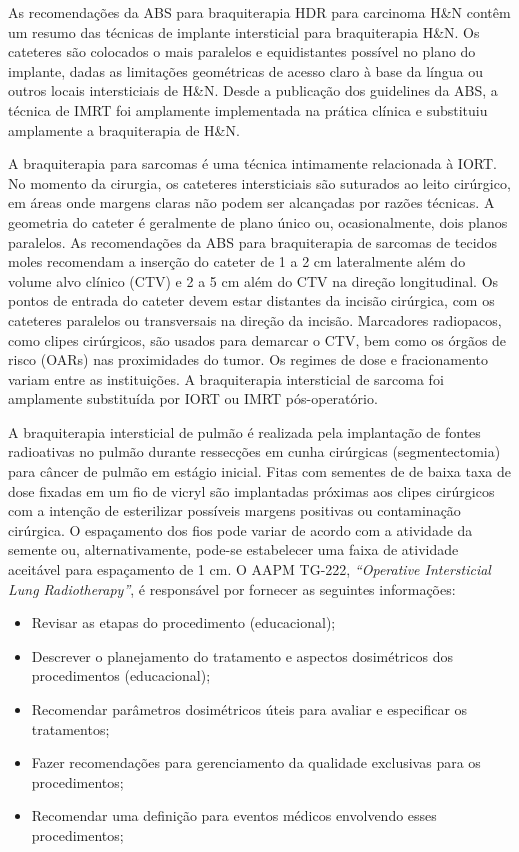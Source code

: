 \documentclass[11pt,a4paper]{article}
\begin{document}
	As recomendações da ABS para braquiterapia HDR para carcinoma H\&N contêm um resumo das técnicas de implante intersticial para braquiterapia H\&N. Os cateteres são colocados o mais paralelos e equidistantes possível no plano do implante, dadas as limitações geométricas de acesso claro à base da língua ou outros locais intersticiais de H\&N. Desde a publicação dos guidelines da ABS, a técnica de IMRT foi amplamente implementada na prática clínica e substituiu amplamente a braquiterapia de H\&N.

	A braquiterapia para sarcomas é uma técnica intimamente relacionada à IORT. No momento da cirurgia, os cateteres intersticiais são suturados ao leito cirúrgico, em áreas onde margens claras não podem ser alcançadas por razões técnicas. A geometria do cateter é geralmente de plano único ou, ocasionalmente, dois planos paralelos. As recomendações da ABS para braquiterapia de sarcomas de tecidos moles recomendam a inserção do cateter de 1 a 2 cm lateralmente além do volume alvo clínico (CTV) e 2 a 5 cm além do CTV na direção longitudinal. Os pontos de entrada do cateter devem estar distantes da incisão cirúrgica, com os cateteres paralelos ou transversais na direção da incisão. Marcadores radiopacos, como clipes cirúrgicos, são usados para demarcar o CTV, bem como os órgãos de risco (OARs) nas proximidades do tumor. Os regimes de dose e fracionamento variam entre as instituições. A braquiterapia intersticial de sarcoma foi amplamente substituída por IORT ou IMRT pós-operatório.

	A braquiterapia intersticial de pulmão é realizada pela implantação de fontes radioativas no pulmão durante ressecções em cunha cirúrgicas (segmentectomia) para câncer de pulmão em estágio inicial. Fitas com sementes de  de baixa taxa de dose fixadas em um fio de vicryl são implantadas próximas aos clipes cirúrgicos com a intenção de esterilizar possíveis margens positivas ou contaminação cirúrgica. O espaçamento dos fios pode variar de acordo com a atividade da semente ou, alternativamente, pode-se estabelecer uma faixa de atividade aceitável para espaçamento de 1 cm. O AAPM TG-222, \textit{``Operative Intersticial Lung Radiotherapy''}, é responsável por fornecer as seguintes informações:

	\begin{itemize}[label=\textcolor{CarnationPink}{$\blacktriangleright$}]
		\item Revisar as etapas do procedimento (educacional);
		\item Descrever o planejamento do tratamento e aspectos dosimétricos dos procedimentos (educacional);
		\item Recomendar parâmetros dosimétricos úteis para avaliar e especificar os tratamentos;
		\item Fazer recomendações para gerenciamento da qualidade exclusivas para os procedimentos;
		\item Recomendar uma definição para eventos médicos envolvendo esses procedimentos;
	\end{itemize}
\end{document}
